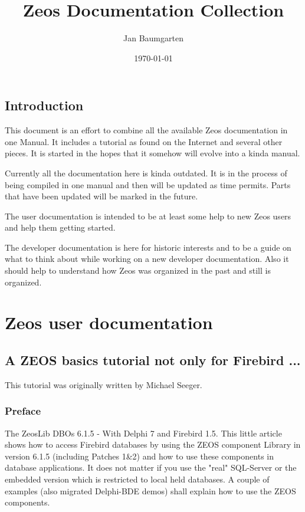 \documentclass[a4paper,12pt,oneside]{book}
\title{Zeos Documentation Collection}
\author{Jan Baumgarten}
\date{\today}
\begin{document}
\maketitle
\tableofcontents

\chapter{Introduction}
This document is an effort to combine all the available Zeos documentation in one Manual.
It includes a tutorial as found on the Internet and several other pieces.
It is started in the hopes that it somehow will evolve into a kinda manual.

Currently all the documentation here is kinda outdated.
It is in the process of being compiled in one manual and then will be updated as time permits.
Parts that have been updated will be marked in the future.

The user documentation is intended to be at least some help to new Zeos users and help them getting started.

The developer documentation is here for historic interests and to be a guide on what to think about while working on a new developer documentation.
Also it should help to understand how Zeos was organized in the past and still is organized.

\part{Zeos user documentation}

\chapter{A ZEOS basics tutorial not only for Firebird ...}
This tutorial was originally written by Michael Seeger.

\section{Preface}
The ZeosLib DBOs 6.1.5 - With Delphi 7 and Firebird 1.5.
This little article shows how to access Firebird databases by using the ZEOS component Library in version 6.1.5 (including Patches 1\&2) and how to use these components in database applications.
It does not matter if you use the "real" SQL-Server or the embedded version which is restricted to local held databases.
A couple of examples (also migrated Delphi-BDE demos) shall explain how to use the ZEOS
components.
\end{document}
